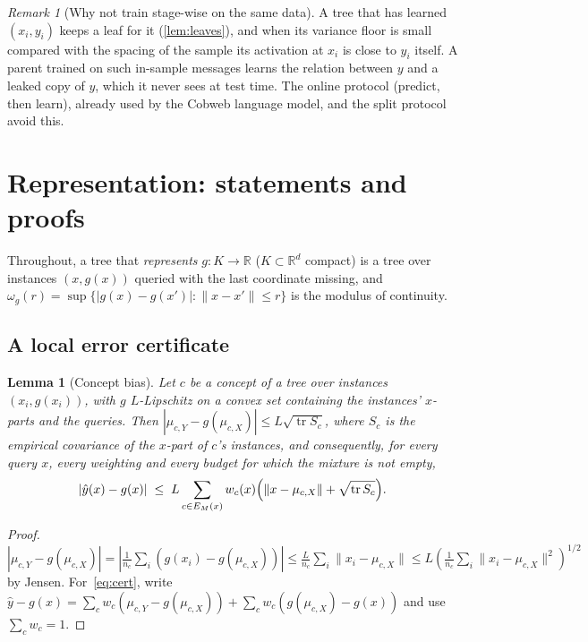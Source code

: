 \documentclass[11pt]{article}
\newtheorem{lemma}[theorem]{Lemma}
\theoremstyle{definition}
\theoremstyle{remark}
\newtheorem{remark}[theorem]{Remark}
\newcommand{\R}{\mathbb{R}}
\newcommand{\hy}{\hat{y}}
\newcommand{\tr}{\operatorname{tr}}
\begin{document}
\begin{remark}[Why not train stage-wise on the same data]
A tree that has learned $(x_i,y_i)$ keeps a leaf for it (\cref{lem:leaves}), and when
its variance floor is small compared with the spacing of the sample its activation at
$x_i$ is close to $y_i$ itself.  A parent trained on such in-sample
messages learns the relation between $y$ and a leaked copy of $y$, which it never sees at
test time.  The online protocol (predict, then learn), already used by the Cobweb
language model, and the split protocol avoid this.
\end{remark}

\section{Representation: statements and proofs}\label{sec:repr}

Throughout, a tree that \emph{represents} $g:K\to\R$ ($K\subset\R^d$ compact) is a tree
over instances $(x,g(x))$ queried with the last coordinate missing, and
$\omega_g(r)=\sup\{|g(x)-g(x')|:\|x-x'\|\le r\}$ is the modulus of continuity.

\subsection{A local error certificate}

\begin{lemma}[Concept bias]\label{lem:bias}
Let $c$ be a concept of a tree over instances $(x_i,g(x_i))$, with $g$ $L$-Lipschitz on a
convex set containing the instances' $x$-parts and the queries.
Then $|\mu_{c,Y}-g(\mu_{c,X})|\le L\sqrt{\tr S_c}$, where $S_c$ is the empirical
covariance of the $x$-part of $c$'s instances, and consequently, for every query $x$,
every weighting and every budget for which the mixture is not empty,
\begin{equation}\label{eq:cert}
  |\hy(x)-g(x)|\;\le\;L\sum_{c\in E_M(x)}w_c(x)\Bigl(\|x-\mu_{c,X}\|+\sqrt{\tr S_c}\Bigr).
\end{equation}
\end{lemma}
\begin{proof}
$|\mu_{c,Y}-g(\mu_{c,X})|=|\tfrac{1}{n_c}\sum_i(g(x_i)-g(\mu_{c,X}))|\le
\tfrac{L}{n_c}\sum_i\|x_i-\mu_{c,X}\|\le L(\tfrac1{n_c}\sum_i\|x_i-\mu_{c,X}\|^2)^{1/2}$
by Jensen.  For~\eqref{eq:cert}, write $\hy-g(x)=\sum_c w_c(\mu_{c,Y}-g(\mu_{c,X}))+
\sum_c w_c(g(\mu_{c,X})-g(x))$ and use $\sum_cw_c=1$.
\end{proof}
\end{document}
